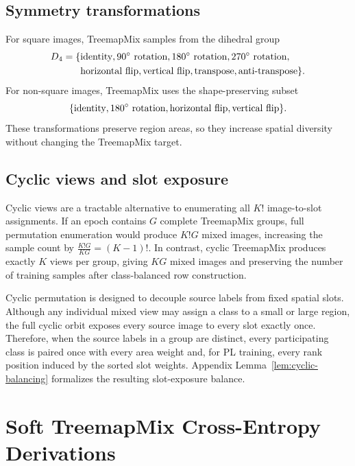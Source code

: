 \subsection{Symmetry transformations}

For square images, TreemapMix samples from the dihedral group
\[
\begin{aligned}
D_4=\{&
\text{identity},\space
90^\circ\text{ rotation},\space
180^\circ\text{ rotation},\space
270^\circ\text{ rotation},\\
&
\text{horizontal flip},\space
\text{vertical flip},\space
\text{transpose},\space
\text{anti-transpose}
\}.
\end{aligned}
\]
For non-square images, TreemapMix uses the shape-preserving subset
\[
\{
\text{identity},\space
180^\circ\text{ rotation},\space
\text{horizontal flip},\space
\text{vertical flip}
\}.
\]
These transformations preserve region areas, so they increase spatial diversity without changing the TreemapMix target.

\subsection{Cyclic views and slot exposure}\label{app:cyclic-views}

Cyclic views are a tractable alternative to enumerating all $K!$ image-to-slot assignments. If an epoch contains $G$ complete TreemapMix groups, full permutation enumeration would produce $K!G$ mixed images, increasing the sample count by \(\frac{K!G}{KG}=(K-1)!\). In contrast, cyclic TreemapMix produces exactly $K$ views per group, giving $KG$ mixed images and preserving the number of training samples after class-balanced row construction.

Cyclic permutation is designed to decouple source labels from fixed spatial slots. Although any individual mixed view may assign a class to a small or large region, the full cyclic orbit exposes every source image to every slot exactly once. Therefore, when the source labels in a group are distinct, every participating class is paired once with every area weight and, for PL training, every rank position induced by the sorted slot weights. Appendix Lemma~\ref{lem:cyclic-balancing} formalizes the resulting slot-exposure balance.

\section{Soft TreemapMix Cross-Entropy Derivations}\label{app:soft-ce}

